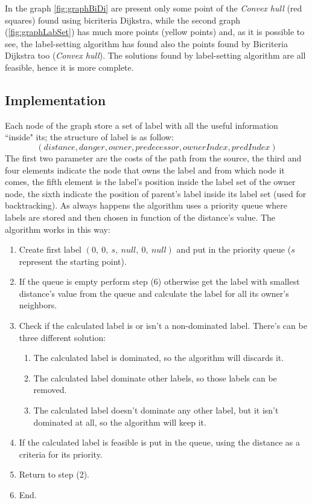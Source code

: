 \documentclass[a4paper,11pt]{report}
\begin{document}
In the graph \ref{fig:graphBiDi} are present only some point of the \textit{Convex hull} (red squares) found using bicriteria Dijkstra, while the second graph (\ref{fig:graphLabSet}) has much more points (yellow points) and, as it is possible to see, the label-setting algorithm has found also the points found by Bicriteria Dijkstra too (\textit{Convex hull}). The solutions found by label-setting algorithm are all feasible, hence it is more complete.

\subsection{Implementation}
Each node of the graph store a set of label with all the useful information ``inside" its; the structure of label is as follow:
$$(distance, danger, owner, predecessor, ownerIndex, predIndex)$$
The first two parameter are the costs of the path from the source, the third and four elements indicate the node that owns the label and from which node it comes, the fifth element is the label's position inside the label set of the owner node, the sixth indicate the position of parent's label inside its label set (used for backtracking).
As always happens the algorithm uses a priority queue where labels are stored and then chosen in function of the distance's value. The algorithm works in this way:

\begin{enumerate}[label=\roman*.]
	\item Create first label $(0,\ 0,\ s,\ null,\ 0,\ null)$ and put in the priority queue ($s$ represent the starting point).
	\item If the queue is empty perform step ({6}) otherwise get the label with smallest distance's value from the queue and calculate the label for all its owner's neighbors.
	\item Check if the calculated label is or isn't a non-dominated label. There's can be three different solution: 
	\begin{enumerate}
		\item The calculated label is dominated, so the algorithm will discards it.
		\item The calculated label dominate other labels, so those labels can be removed.
		\item The calculated label doesn't dominate any other label, but it isn't dominated at all, so the algorithm will keep it.
	\end{enumerate}
	\item If the calculated label is feasible is put in the queue, using the distance as a criteria for its priority.
	\item Return to step ({2}).
	\item End.
\end{enumerate}
\end{document}
